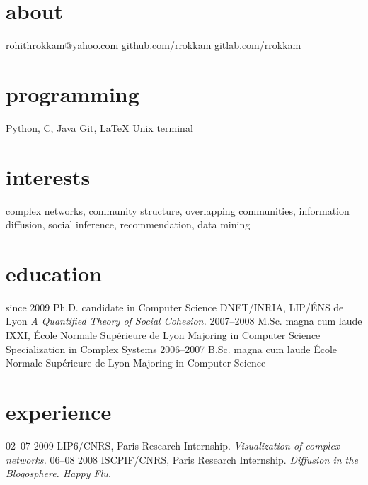 \documentclass{cv}
\begin{document}

\begin{aside}
  \section{about}
    rohithrokkam@yahoo.com
    github.com/rrokkam
    gitlab.com/rrokkam
  \section{programming}
    Python, C, Java
    Git, \LaTeX
    Unix terminal
\end{aside}

\section{interests}

complex networks, community structure, overlapping communities, information
diffusion, social inference, recommendation, data mining

\section{education}

\begin{entrylist}
  \entry
    {since 2009}
    {Ph.D. {\normalfont candidate in Computer Science}}
    {DNET/INRIA, LIP/ÉNS de Lyon}
    {\emph{A Quantified Theory of Social Cohesion.}}
  \entry
    {2007–2008}
    {M.Sc. magna cum laude}
    {IXXI, École Normale Supérieure de Lyon}
    {Majoring in Computer Science\\
    Specialization in Complex Systems}
  \entry
    {2006–2007}
    {B.Sc. magna cum laude}
    {École Normale Supérieure de Lyon}
    {Majoring in Computer Science}
\end{entrylist}

\section{experience}

\begin{entrylist}
  \entry
    {02–07 2009}
    {LIP6/CNRS, Paris}
    {Research Internship.}
    {\emph{Visualization of complex networks.}}
  \entry
    {06–08 2008}
    {ISCPIF/CNRS, Paris}
    {Research Internship.}
    {\emph{Diffusion in the Blogosphere. Happy Flu.}}
\end{entrylist}
\end{document}
